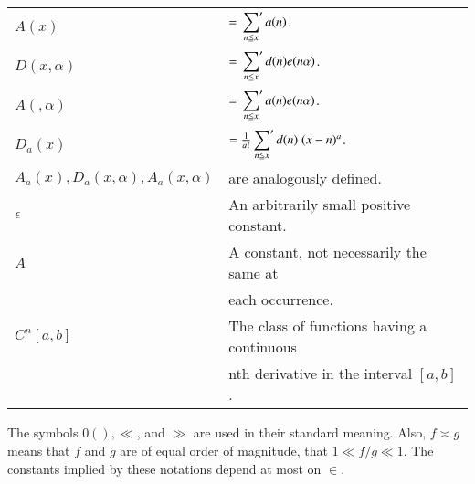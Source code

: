 {\begin{longtable}{ll}
$A(x)$ & $=\sideset{}{'}\sum\limits_{n\leqq x}a(n)$.\\
$D(x,\alpha)$ & $=\sideset{}{'}\sum\limits_{n\leqq x}d(n)e(n\alpha)$.\\
$A(,\alpha)$ & $=\sideset{}{'}\sum\limits_{n\leqq x}a(n)e(n\alpha)$.\\
$D_a(x)$ & $=\frac{1}{a!}\sideset{}{'}\sum\limits_{n\leqq x}d(n)\;(x-n)^a$.\\
$A_a(x), D_a(x,\alpha), A_a(x,\alpha)$ & are analogously defined.\\
$\epsilon$ & An arbitrarily small positive constant.\\
$A$ & A constant, not necessarily the same at\\
& each occurrence.\\
$C^n[a,b]$ & The class of functions having a continuous\\
& nth derivative in the interval $[a,b]$. 
\end{longtable}}

The symbols $0(), \ll$, and $\gg$ are used in their standard
meaning. Also, $f\asymp g$ means that $f$ and $g$ are of equal order
of magnitude, \ie that $1\ll f/g\ll 1$. The constants implied by these
notations depend at most on $\in$.  

